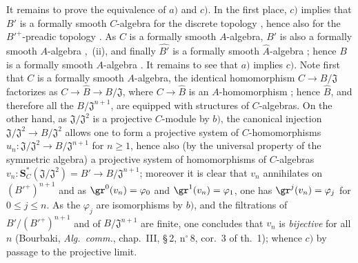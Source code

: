 \begin{env}[19.5.4.4]
\label{0.19.5.4.4}
It remains to prove the equivalence of $a)$ and $c)$.
In the first place, $c)$ implies that $B'$ is a formally smooth $C$-algebra for the discrete topology , hence also for the ${B'}^+$-preadic topology .
As $C$ is a formally smooth $A$-algebra, $B'$ is also a formally smooth $A$-algebra ,~{\rm(ii)}, and finally $\widehat{B'}$ is a formally smooth $\widehat{A}$-algebra ; hence $B$ is a formally smooth $A$-algebra .
It remains to see that $a)$ implies $c)$.
Note first that $C$ is a formally smooth $A$-algebra, the identical homomorphism $C\to B/\mathfrak{J}$ factorizes as $C\to\widehat{B}\to B/\mathfrak{J}$, where $C\to\widehat{B}$ is an $A$-homomorphism ;
hence $\widehat{B}$, and therefore all the $B/\mathfrak{J}^{n+1}$, are equipped with structures of $C$-algebras.
On the other hand, as $\mathfrak{J}/\mathfrak{J}^2$ is a projective $C$-module by $b)$, the canonical injection $\mathfrak{J}/\mathfrak{J}^2\to B/\mathfrak{J}^2$ allows one to form a projective system of $C$-homomorphisms $u_n:\mathfrak{J}/\mathfrak{J}^2\to B/\mathfrak{J}^{n+1}$ for $n\geq 1$, hence also (by the universal property of the symmetric algebra) a projective system of homomorphisms of $C$-algebras $v_n:\mathbf{S}_C^*(\mathfrak{J}/\mathfrak{J}^2)=B'\to B/\mathfrak{J}^{n+1}$;
moreover it is clear that $v_n$ annihilates on $({B'}^+)^{n+1}$ and as $\gr^0(v_n)=\varphi_0$ and $\gr^1(v_n)=\varphi_1$, one has $\gr^j(v_n)=\varphi_j$ for $0\leq j\leq n$.
As the $\varphi_j$ are isomorphisms by $b)$, and the filtrations of $B'/({B'}^+)^{n+1}$ and of $B/\mathfrak{J}^{n+1}$ are finite, one concludes that $v_n$ is \emph{bijective} for
all $n$ (Bourbaki, \emph{Alg.\ comm.}, chap.~III, \S\,2, n$^\circ$\,8, cor.~3 of th.~1); whence $c)$ by passage to the projective limit.
\end{env}

